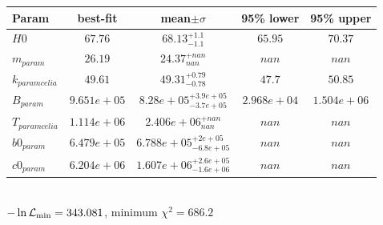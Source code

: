 \begin{tabular}{|l|c|c|c|c|} 
 \hline 
Param & best-fit & mean$\pm\sigma$ & 95\% lower & 95\% upper \\ \hline 
$H0$ &$67.76$ & $68.13_{-1.1}^{+1.1}$ & $65.95$ & $70.37$ \\ 
$m_{param }$ &$26.19$ & $24.37_{nan}^{+nan}$ & $nan$ & $nan$ \\ 
$k_{param celia }$ &$49.61$ & $49.31_{-0.78}^{+0.79}$ & $47.7$ & $50.85$ \\ 
$B_{param }$ &$9.651e+05$ & $8.28e+05_{-3.7e+05}^{+3.9e+05}$ & $2.968e+04$ & $1.504e+06$ \\ 
$T_{param celia }$ &$1.114e+06$ & $2.406e+06_{nan}^{+nan}$ & $nan$ & $nan$ \\ 
$b0_{param }$ &$6.479e+05$ & $6.788e+05_{-6.8e+05}^{+2e+05}$ & $nan$ & $nan$ \\ 
$c0_{param }$ &$6.204e+06$ & $1.607e+06_{-1.6e+06}^{+2.6e+05}$ & $nan$ & $nan$ \\ 
\hline 
 \end{tabular} \\ 
$-\ln{\cal L}_\mathrm{min} =343.081$, minimum $\chi^2=686.2$ \\ 
